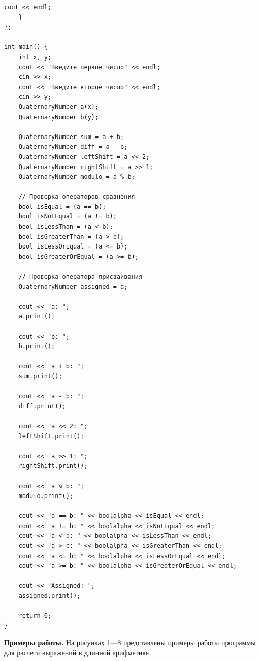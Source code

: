 \documentclass[12pt, a4paper]{article}
\begin{document}
\begin{lstlisting}[caption={Исходный код}, label={lst:label1}]
        cout << endl;
    }
};

int main() {
    int x, y;
    cout << "Введите первое число" << endl;
    cin >> x;
    cout << "Введите второе число" << endl;
    cin >> y;
    QuaternaryNumber a(x);
    QuaternaryNumber b(y);

    QuaternaryNumber sum = a + b;
    QuaternaryNumber diff = a - b;
    QuaternaryNumber leftShift = a << 2;
    QuaternaryNumber rightShift = a >> 1;
    QuaternaryNumber modulo = a % b;

    // Проверка операторов сравнения
    bool isEqual = (a == b);
    bool isNotEqual = (a != b);
    bool isLessThan = (a < b);
    bool isGreaterThan = (a > b);
    bool isLessOrEqual = (a <= b);
    bool isGreaterOrEqual = (a >= b);

    // Проверка оператора присваивания
    QuaternaryNumber assigned = a;

    cout << "a: ";
    a.print();

    cout << "b: ";
    b.print();

    cout << "a + b: ";
    sum.print();

    cout << "a - b: ";
    diff.print();

    cout << "a << 2: ";
    leftShift.print();

    cout << "a >> 1: ";
    rightShift.print();

    cout << "a % b: ";
    modulo.print();

    cout << "a == b: " << boolalpha << isEqual << endl;
    cout << "a != b: " << boolalpha << isNotEqual << endl;
    cout << "a < b: " << boolalpha << isLessThan << endl;
    cout << "a > b: " << boolalpha << isGreaterThan << endl;
    cout << "a <= b: " << boolalpha << isLessOrEqual << endl;
    cout << "a >= b: " << boolalpha << isGreaterOrEqual << endl;

    cout << "Assigned: ";
    assigned.print();

    return 0;
}
\end{lstlisting}
\newpage
\textbf{Примеры работы.}
На рисунках 1---8 представлены примеры работы программы для расчета выражений
в длинной арифметике.
\end{document}
